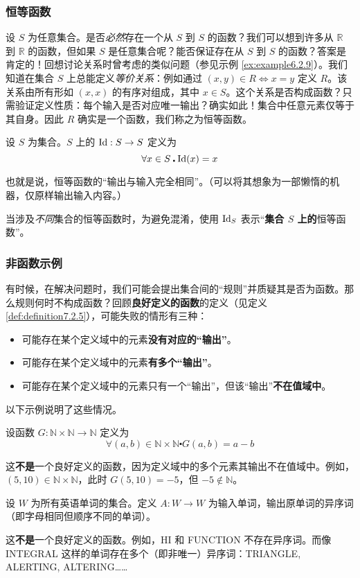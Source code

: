 \subsubsection*{恒等函数}

设 $S$ 为任意集合。是否\emph{必然}存在一个从 $S$ 到 $S$ 的函数？我们可以想到许多从 $\mathbb{R}$ 到 $\mathbb{R}$ 的函数，但如果 $S$ 是任意集合呢？能否保证存在从 $S$ 到 $S$ 的函数？答案是肯定的！回想讨论关系时曾考虑的类似问题（参见示例 \ref{ex:example6.2.9}）。我们知道在集合 $S$ 上总能定义\emph{等价关系}：例如通过 $(x, y) \in R \iff x = y$ 定义 $R$。该关系由所有形如 $(x, x)$ 的有序对组成，其中 $x \in S$。这个关系是否构成函数？只需验证定义性质：每个输入是否对应唯一输出？确实如此！集合中任意元素仅等于其自身。因此 $R$ 确实是一个函数，我们称之为恒等函数。

\begin{definition}[恒等函数]
    设 $S$ 为集合。$S$ 上的 $\text{Id} : S \to S$ 定义为
    \[\forall x \in S \centerdot \text{Id}(x) = x\]
\end{definition}

也就是说，恒等函数的``输出与输入完全相同''。（可以将其想象为一部懒惰的机器，仅原样输出输入内容。）

当涉及\emph{不同}集合的恒等函数时，为避免混淆，使用 $\text{Id}_S$ 表示``\textbf{集合 $S$ 上的}恒等函数''。

\subsubsection*{非函数示例}

有时候，在解决问题时，我们可能会提出集合间的``规则''并质疑其是否为函数。那么规则何时不构成函数？回顾\textbf{良好定义的函数}的定义（见定义 \ref{def:definition7.2.5}），可能失败的情形有三种：

\begin{itemize}
    \item 可能存在某个定义域中的元素\textbf{没有对应的``输出''}。
    \item 可能存在某个定义域中的元素\textbf{有多个``输出''}。
    \item 可能存在某个定义域中的元素只有一个``输出''，但该``输出''\textbf{不在值域中}。
\end{itemize}
以下示例说明了这些情况。

\begin{example}
    设函数 $G : \mathbb{N} \times \mathbb{N} \to \mathbb{N}$ 定义为
    \[\forall (a, b) \in \mathbb{N} \times \mathbb{N} \centerdot G(a, b) = a - b\]

    这\textbf{不是}一个良好定义的函数，因为定义域中的多个元素其输出不在值域中。例如，$(5, 10) \in \mathbb{N} \times \mathbb{N}$，此时 $G(5, 10) = -5$，但 $-5 \notin \mathbb{N}$。
\end{example}

\clearpage

\begin{example}
    设 $W$ 为所有英语单词的集合。定义 $A: W \to W$ 为输入单词，输出原单词的异序词（即字母相同但顺序不同的单词）。
    
    这\textbf{不是}一个良好定义的函数。例如，HI 和 FUNCTION 不存在异序词。而像 INTEGRAL 这样的单词存在多个（即非唯一）异序词：TRIANGLE, ALERTING, ALTERING……
\end{example}